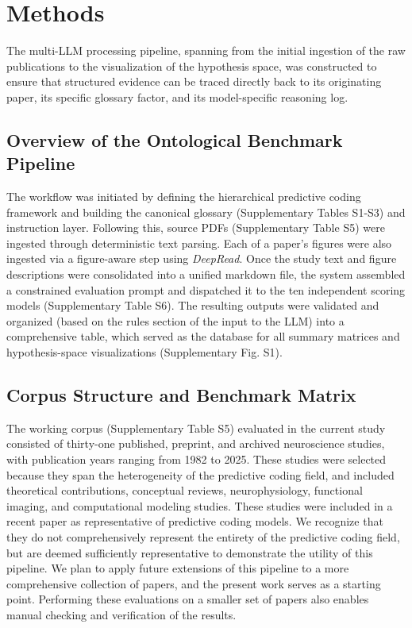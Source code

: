 \documentclass[12pt]{article}
\begin{document}
\section{Methods}\label{methods}

The multi-LLM processing pipeline, spanning from the initial ingestion of the raw publications to the visualization of the hypothesis space, was constructed to ensure that structured evidence can be traced directly back to its originating paper, its specific glossary factor, and its model-specific reasoning log.

\subsection{Overview of the Ontological Benchmark Pipeline}\label{overview-of-the-ontological-benchmark-pipeline}

The workflow was initiated by defining the hierarchical predictive coding framework and building the canonical glossary (Supplementary Tables S1-S3) and instruction layer. Following this, source PDFs (Supplementary Table S5) were ingested through deterministic text parsing. Each of a paper's figures were also ingested via a figure-aware step using \emph{DeepRead}\cite{ref57}. Once the study text and figure descriptions were consolidated into a unified markdown file, the system assembled a constrained evaluation prompt and dispatched it to the ten independent scoring models (Supplementary Table S6). The resulting outputs were validated and organized (based on the rules section of the input to the LLM) into a comprehensive table, which served as the database for all summary matrices and hypothesis-space visualizations (Supplementary Fig. S1).

\subsection{Corpus Structure and Benchmark Matrix}\label{corpus-structure-and-benchmark-matrix}

The working corpus (Supplementary Table S5) evaluated in the current study consisted of thirty-one published, preprint, and archived neuroscience studies, with publication years ranging from 1982 to 2025. These studies were selected because they span the heterogeneity of the predictive coding field, and included theoretical contributions, conceptual reviews, neurophysiology, functional imaging, and computational modeling studies. These studies were included in a recent paper as representative of predictive coding models\cite{ref34}. We recognize that they do not comprehensively represent the entirety of the predictive coding field, but are deemed sufficiently representative to demonstrate the utility of this pipeline. We plan to apply future extensions of this pipeline to a more comprehensive collection of papers, and the present work serves as a starting point. Performing these evaluations on a smaller set of papers also enables manual checking and verification of the results.
\end{document}
